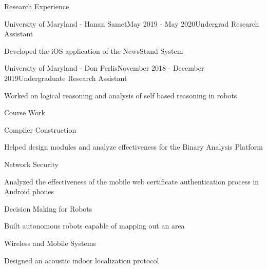 \documentclass{resume} %
\begin{document}
\begin{rSection}{Research Experience}

\begin{rSubsection}{University of Maryland - Hanan Samet}{May 2019 - May 2020}{Undergrad Research Assistant}{}
\item Developed the iOS application of the NewsStand System
\end{rSubsection}

\begin{rSubsection}{University of Maryland - Don Perlis}{November 2018 - December 2019}{Undergraduate Research Assistant}{}
\item Worked on logical reasoning and analysis of self based reasoning in robots
\end{rSubsection}

\end{rSection}



\begin{rSection}{Course Work}

\begin{rSubsection}{Compiler Construction}{}{}{}
\item Helped design modules and analyze effectiveness for the Binary Analysis Platform
\end{rSubsection}

\begin{rSubsection}{Network Security}{}{}{}
\item Analyzed the effectiveness of the mobile web certificate authentication process in Android phones
\end{rSubsection}

\begin{rSubsection}{Decision Making for Robots}{}{}{}
\item Built autonomous robots capable of mapping out an area
\end{rSubsection}

\begin{rSubsection}{Wireless and Mobile Systems}{}{}{}
\item Designed an acoustic indoor localization protocol 
\end{rSubsection}
\end{rSection}
\end{document}
